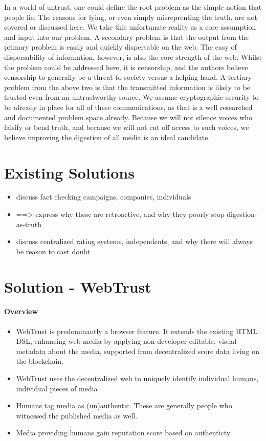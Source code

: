 \documentclass{paper}
\begin{document}
In a world of untrust, one could define the root problem as the simple notion
that people lie.  The reasons for lying, or even simply misreprenting the
truth, are not covered or discussed here.  We take this unfortunate reality as
a core assumption and input into our problem.  A secondary problem is that the
output from the primary problem is easily and quickly dispersable on the web.
The easy of dispersability of information, however, is also the core strength of
the web.  Whilst the problem could be addressed here, it is censorship, and the
authors believe censorship to generally be a threat to society versus a helping
hand.  A tertiary problem from the above two is that the transmitted information
is likely to be trusted even from an untrustworthy source.  We assume
cryptographic security to be already in place for all of these communications,
as that is a well researched and documented problem space already.  Because we
will not silence voices who falsify or bend truth, and because we will not
cut off access to such voices, we believe improving the digestion of all
media is an ideal candidate.

\section{Existing Solutions}

\begin{itemize}
  \item discuss fact checking campaigns, companies, individuals
  \item ==> express why these are retroactive, and why they poorly stop digestion-as-truth
  \item discuss centralized rating systems, independents, and why there will always be reason to cast doubt
\end{itemize}

\section{Solution - WebTrust}

\paragraph{Overview}
\begin{itemize}
  \item WebTrust is predominantly a browser feature.  It
  extends the existing HTML DSL, enhancing web media by applying non-developer
  editable, visual metadata about the media, supported from decentralized score
  data living on the blockchain.
  \item WebTrust uses the decentralized web to uniquely identify individual humans, individual pieces of media
  \item Humans tag media as (un)authentic.  These are generally people who witnessed the published media as well.
  \item Media providing humans gain reputation score based on authenticty
\end{itemize}
\end{document}
